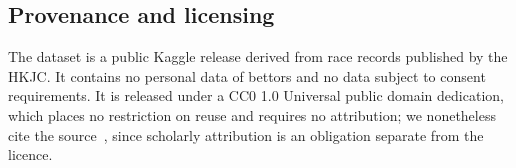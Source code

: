 \subsection{Provenance and licensing}

The dataset is a public Kaggle release derived from race records
published by the HKJC. It contains no personal data of bettors and no data
subject to consent requirements. It is released under a CC0 1.0 Universal
public domain dedication, which places no restriction on reuse and requires
no attribution; we nonetheless cite the
source~\cite{ejeC_daley_hkracing}, since scholarly attribution is an
obligation separate from the licence.